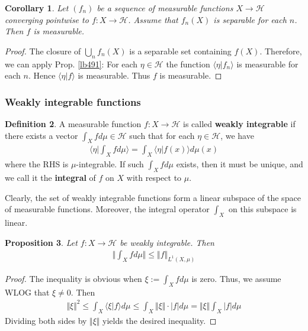\documentclass[12pt,b5paper,notitlepage]{article}
\theoremstyle{definition}
\newtheorem{df}{Definition}[subsection]
\theoremstyle{plain}
\newtheorem{pp}[df]{Proposition}
\newtheorem{co}[df]{Corollary}
\newcommand{\bk}[1]{\langle {#1}\rangle}
\newcommand{\Bigbk}[1]{\Big\langle {#1}\Big\rangle}
\newcommand{\MH}{\mathcal H}
\numberwithin{equation}{section}
\begin{document}
\begin{subappendices}
\begin{co}\label{lb519}
Let $(f_n)$ be a sequence of measurable functions $X\rightarrow \MH$ converging pointwise to $f:X\rightarrow \MH$. Assume that $f_n(X)$ is separable for each $n$. Then $f$ is measurable.
\end{co}

\begin{proof}
The closure of $\bigcup_n f_n(X)$ is a separable set containing $f(X)$. Therefore, we can apply Prop. \ref{lb491}: For each $\eta\in \MH$ the function $\bk{\eta|f_n}$ is measurable for each $n$. Hence $\bk{\eta|f}$ is measurable. Thus $f$ is measurable. 
\end{proof}




\subsubsection{Weakly integrable functions}


\begin{df}
A measurable function $f:X\rightarrow \MH$ is called \textbf{weakly integrable}  if there exists a vector $\int_X fd\mu\in \MH$ such that for each $\eta\in \MH$, we have
\begin{align*}
\Bigbk{\eta\Big|\int_X fd\mu}=\int_X\bk{\eta|f(x)}d\mu(x)
\end{align*} 
where the RHS is $\mu$-integrable. If such $\int_X fd\mu$ exists, then it must be unique, and we call it the \textbf{integral}  of $f$ on $X$ with respect to $\mu$.
\end{df}




Clearly, the set of weakly integrable functions form a linear subspace of the space of measurable functions. Moreover, the integral operator $\int_X$ on this subspace is linear.









\begin{pp}\label{lb493}
Let $f:X\rightarrow \MH$ be weakly integrable. Then
\begin{align*}
\Big\Vert\int_Xfd\mu\Big\Vert\leq \Vert f\Vert_{L^1(X,\mu)}
\end{align*}
\end{pp}


\begin{proof}
The inequality is obvious when $\xi:=\int_Xfd\mu$ is zero. Thus, we assume WLOG that $\xi\neq0$. Then
\begin{align*}
\Vert\xi\Vert^2\leq\int_X\bk{\xi|f}d\mu\leq\int_X \Vert\xi\Vert\cdot |f|d\mu= \Vert\xi\Vert\int_X|f|d\mu
\end{align*}
Dividing both sides by $\Vert\xi\Vert$ yields the desired inequality.
\end{proof}


\end{subappendices}
\end{document}
